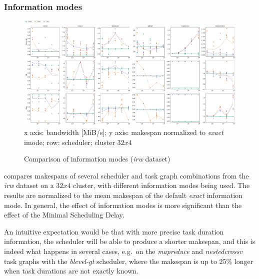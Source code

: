 \subsubsection*{Information modes}

\begin{figure}
	\centering
	\includegraphics[width=\textwidth]{imgs/estee/charts/irw-32x4-imode-score}\\
	{\small x axis: bandwidth [MiB/s]; y axis: makespan normalized to
	\emph{exact}
	imode; row: scheduler; cluster $32x4$} \caption{Comparison of information modes (\emph{irw} dataset)}
	\label{fig:estee-chart-irw-imode}
\end{figure}


 compares makespans of several scheduler and task graph combinations
from the \emph{irw} dataset on a $32x4$ cluster, with different
information modes being used. The results are normalized to the mean makespan of the default
\emph{exact} information mode. In general, the effect of information modes is more
significant than the effect of the Minimal Scheduling Delay.

An intuitive expectation would be that with more precise task duration information, the scheduler
will be able to produce a shorter makespan, and this is indeed what happens in several cases, e.g.\
on the \emph{mapreduce} and \emph{nestedcrossv} task graphs with the
\emph{blevel-gt} scheduler, where the makespan is up to 25\% longer when task durations are
not exactly known.

